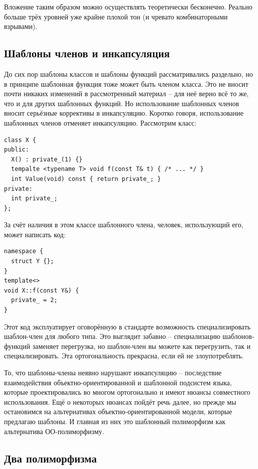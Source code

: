 \documentclass[a4paper,12pt,oneside]{article}
\begin{document}
Вложение таким образом можно осуществлять теоретически бесконечно. Реально больше трёх уровней уже крайне плохой тон (и чревато комбинаторными взрывами).

\subsection{Шаблоны членов и инкапсуляция}

До сих пор шаблоны классов и шаблоны функций рассматривались раздельно, но в принципе шаблонная функция тоже может быть членом класса. Это не вносит почти никаких изменений в рассмотренный материал -- для неё верно всё то же, что и для других шаблонных функций. Но использование шаблонных членов вносит серьёзные коррективы в инкапсуляцию. Коротко говоря, использование шаблонных членов отменяет инкапсуляцию. Рассмотрим класс:

\begin{lstlisting}
class X {
public:
  X() : private_(1) {}
  tempalte <typename T> void f(const T& t) { /* ... */ }
  int Value(void) const { return private_; }
private:
  int private_;  
};
\end{lstlisting}

За счёт наличия в этом классе шаблонного члена, человек, использующий его, может написать код:

\begin{lstlisting}
namespace {
  struct Y {};
}
template<>
void X::f(const Y&) {
  private_ = 2;
}
\end{lstlisting}

Этот код эксплуатирует оговорённую в стандарте возможность специализировать шаблон-член для любого типа. Это выглядит забавно -- специализацию шаблонов-функций заменяет перегрузка, но шаблон-член вы можете как перегрузить, так и специализировать. Эта ортогональность прекрасна, если ей не злоупотреблять.

То, что шаблоны-члены неявно нарушают инкапсуляцию -- последствие взаимодействия объектно-ориентированной и шаблонной подсистем языка, которые проектировались во многом ортогонально и имеют нюансы совместного использования. Ещё о некоторых нюансах пойдёт речь далее, но прежде мы остановимся на альтернативах объектно-ориентированной модели, которые предлагаю шаблоны. И главная из них это шаблонный полиморфизм как альтернатива ОО-полиморфизму.

\subsection{Два полиморфизма}
\end{document}
